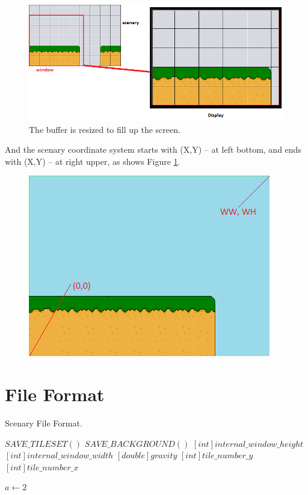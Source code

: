 		\begin{figure}[H]
			\centering
			\includegraphics[width=\textwidth]{img/display.png}
			\caption{The buffer is resized to fill up the screen.}
			\label{fig:display}
		\end{figure}
	
		And the scenary coordinate system starts with (X,Y) -- at left bottom, and ends with (X,Y) -- at right upper, as shows Figure \ref{}.
		
		\begin{figure}[H]
			\centering
			\includegraphics[]{img/scenarycoordinates.png}
			\caption{}
			\label{fig:scenarycoordinates}
		\end{figure}
		
	\section{File Format}
	
	\begin{algorithm}[H]
	\caption{Scenary File Format.}
	  \label{listing-scenaryFormat}
	  \begin{algorithmic}
		\STATE $SAVE\_TILESET()$
		\STATE $SAVE\_BACKGROUND()$
		\STATE $[int]internal\_window\_height$
		\STATE $[int]internal\_window\_width$
		\STATE $[double]gravity$
		\STATE $[int]tile\_number\_y$
		\STATE $[int]tile\_number\_x$
		
		
				\STATE $a \gets 2$
			\ENDFOR
		\ENDFOR
	  \end{algorithmic}
	 \end{algorithm}